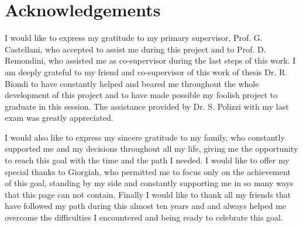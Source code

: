 \documentclass{standalone}
\begin{document}
\chapter*{Acknowledgements}

I would like to express my gratitude to my primary supervisor, Prof. G. Castellani, who accepted to assist me during this project and to Prof. D. Remondini, who assisted me as co-supervisor during the last steps of this work.
I am deeply grateful to my friend and co-supervisor of this work of thesis Dr. R. Biondi to have constantly helped and beared me throughout the whole development of this project and to have made possible my foolish project to graduate in this session.
The assistance provided by Dr. S. Polizzi with my last exam was greatly appreciated.

I would also like to express my sincere gratitude to my family, who constantly supported me and my decisions throughout all my life, giving me the opportunity to reach this goal with the time and the path I needed.
I would like to offer my special thanks to Giorgiah, who permitted me to focus only on the achievement of this goal, standing by my side and constantly supporting me in so many ways that this page can not contain.
Finally I would like to thank all my friends that have followed my path during this almost ten years and and always helped me overcome the difficulties I encountered and being ready to celebrate this goal.
\end{document}
